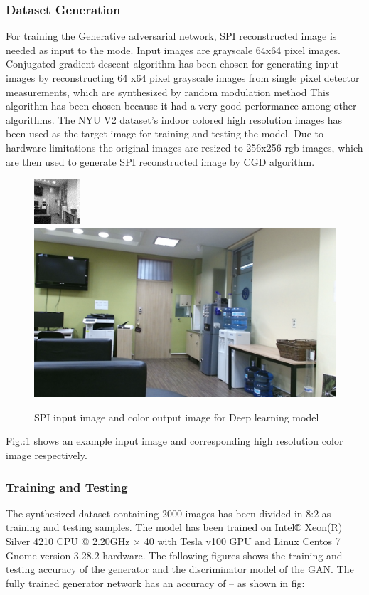 \documentclass[conference]{IEEEtran}
\begin{document}
\subsubsection{Dataset Generation}
\par For training the Generative adversarial network, SPI reconstructed image is needed as input to the mode. Input images are grayscale  64x64 pixel images.
Conjugated gradient descent algorithm has been chosen for generating input images by reconstructing 64 x64 pixel grayscale images from single pixel detector measurements, which are synthesized by random modulation method This algorithm has been chosen because it had a very good performance among other algorithms.
The NYU V2 dataset’s indoor colored high resolution images has been used as the target image for training and testing the model. Due to hardware limitations the original images are resized to 256x256 rgb images, which are then used to generate SPI reconstructed image by CGD algorithm.
\begin{figure}
\centering
\includegraphics[width=.3\linewidth]{figures/input_spi_image.png} %
\includegraphics[width=.535\linewidth]{figures/output_color_image.png}
\caption{SPI input image and color output image for Deep learning model}
\label{fig:deep_learning_model_sample_image}
\end{figure}
\par
Fig.:\ref{fig:deep_learning_model_sample_image} shows an example input image and corresponding high resolution color image respectively.
\medskip
\subsubsection{Training and Testing}
The synthesized dataset containing 2000 images has been divided in 8:2 as training and testing samples. The model has been trained on Intel® Xeon(R) Silver 4210 CPU @ 2.20GHz × 40 with Tesla v100 GPU and Linux Centos 7 Gnome version 3.28.2 hardware.
The following figures shows the training and testing accuracy of the generator and the discriminator model of the GAN.
The fully trained generator network has an accuracy of -- as shown in fig:
\medskip
\end{document}

